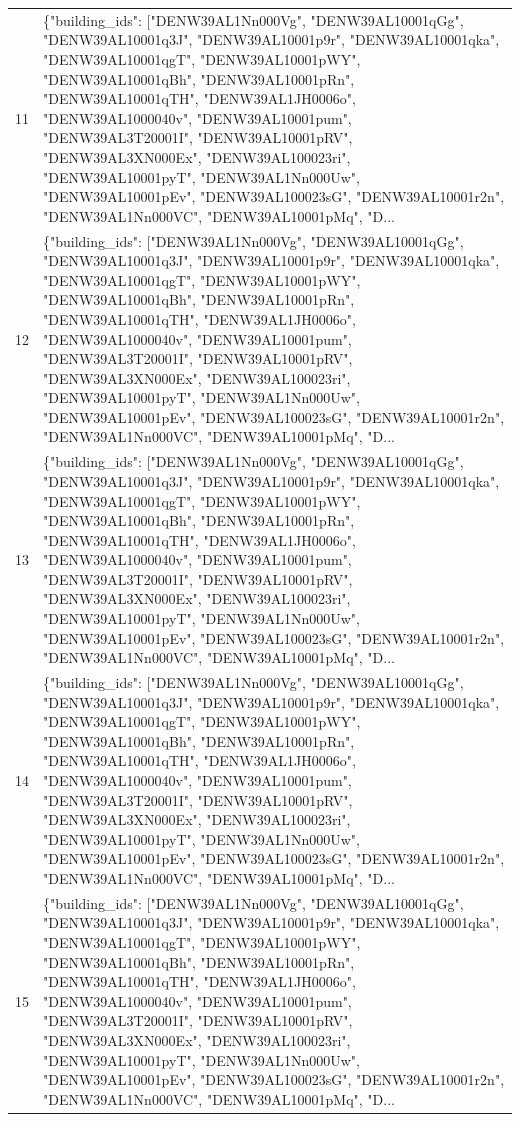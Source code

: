 \documentclass[a4paper,11pt]{article}
\begin{document}
\begin{table}[ht]
\begin{tabular}{r p{12cm}}
11 & \{"building\_ids": ["DENW39AL1Nn000Vg", "DENW39AL10001qGg", "DENW39AL10001q3J", "DENW39AL10001p9r", "DENW39AL10001qka", "DENW39AL10001qgT", "DENW39AL10001pWY", "DENW39AL10001qBh", "DENW39AL10001pRn", "DENW39AL10001qTH", "DENW39AL1JH0006o", "DENW39AL1000040v", "DENW39AL10001pum", "DENW39AL3T20001I", "DENW39AL10001pRV", "DENW39AL3XN000Ex", "DENW39AL100023ri", "DENW39AL10001pyT", "DENW39AL1Nn000Uw", "DENW39AL10001pEv", "DENW39AL100023sG", "DENW39AL10001r2n", "DENW39AL1Nn000VC", "DENW39AL10001pMq", "D... \\
12 & \{"building\_ids": ["DENW39AL1Nn000Vg", "DENW39AL10001qGg", "DENW39AL10001q3J", "DENW39AL10001p9r", "DENW39AL10001qka", "DENW39AL10001qgT", "DENW39AL10001pWY", "DENW39AL10001qBh", "DENW39AL10001pRn", "DENW39AL10001qTH", "DENW39AL1JH0006o", "DENW39AL1000040v", "DENW39AL10001pum", "DENW39AL3T20001I", "DENW39AL10001pRV", "DENW39AL3XN000Ex", "DENW39AL100023ri", "DENW39AL10001pyT", "DENW39AL1Nn000Uw", "DENW39AL10001pEv", "DENW39AL100023sG", "DENW39AL10001r2n", "DENW39AL1Nn000VC", "DENW39AL10001pMq", "D... \\
13 & \{"building\_ids": ["DENW39AL1Nn000Vg", "DENW39AL10001qGg", "DENW39AL10001q3J", "DENW39AL10001p9r", "DENW39AL10001qka", "DENW39AL10001qgT", "DENW39AL10001pWY", "DENW39AL10001qBh", "DENW39AL10001pRn", "DENW39AL10001qTH", "DENW39AL1JH0006o", "DENW39AL1000040v", "DENW39AL10001pum", "DENW39AL3T20001I", "DENW39AL10001pRV", "DENW39AL3XN000Ex", "DENW39AL100023ri", "DENW39AL10001pyT", "DENW39AL1Nn000Uw", "DENW39AL10001pEv", "DENW39AL100023sG", "DENW39AL10001r2n", "DENW39AL1Nn000VC", "DENW39AL10001pMq", "D... \\
14 & \{"building\_ids": ["DENW39AL1Nn000Vg", "DENW39AL10001qGg", "DENW39AL10001q3J", "DENW39AL10001p9r", "DENW39AL10001qka", "DENW39AL10001qgT", "DENW39AL10001pWY", "DENW39AL10001qBh", "DENW39AL10001pRn", "DENW39AL10001qTH", "DENW39AL1JH0006o", "DENW39AL1000040v", "DENW39AL10001pum", "DENW39AL3T20001I", "DENW39AL10001pRV", "DENW39AL3XN000Ex", "DENW39AL100023ri", "DENW39AL10001pyT", "DENW39AL1Nn000Uw", "DENW39AL10001pEv", "DENW39AL100023sG", "DENW39AL10001r2n", "DENW39AL1Nn000VC", "DENW39AL10001pMq", "D... \\
15 & \{"building\_ids": ["DENW39AL1Nn000Vg", "DENW39AL10001qGg", "DENW39AL10001q3J", "DENW39AL10001p9r", "DENW39AL10001qka", "DENW39AL10001qgT", "DENW39AL10001pWY", "DENW39AL10001qBh", "DENW39AL10001pRn", "DENW39AL10001qTH", "DENW39AL1JH0006o", "DENW39AL1000040v", "DENW39AL10001pum", "DENW39AL3T20001I", "DENW39AL10001pRV", "DENW39AL3XN000Ex", "DENW39AL100023ri", "DENW39AL10001pyT", "DENW39AL1Nn000Uw", "DENW39AL10001pEv", "DENW39AL100023sG", "DENW39AL10001r2n", "DENW39AL1Nn000VC", "DENW39AL10001pMq", "D... \\

\end{tabular}
\end{table}
\end{document}
